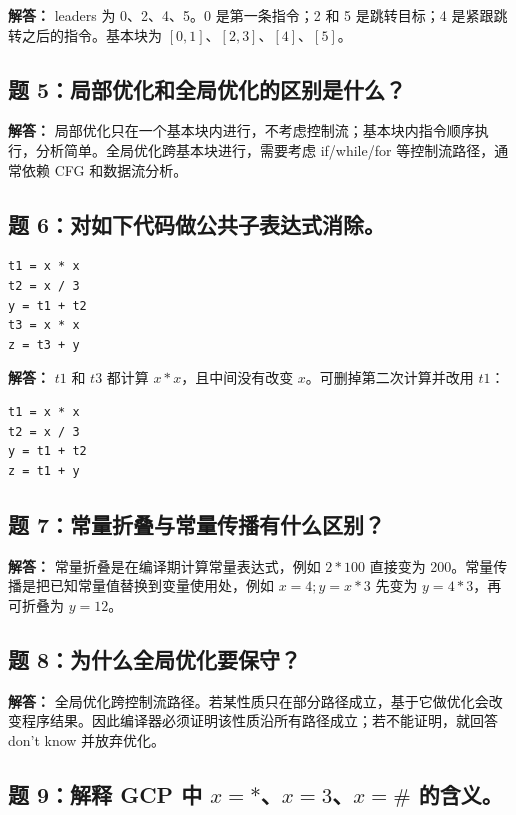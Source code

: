 \documentclass[UTF8,fontset=none,11pt]{ctexart}
\begin{document}
\textbf{解答：} leaders 为 0、2、4、5。0 是第一条指令；2 和 5 是跳转目标；4 是紧跟跳转之后的指令。基本块为 \([0,1]\)、\([2,3]\)、\([4]\)、\([5]\)。

\subsection*{题 5：局部优化和全局优化的区别是什么？}

\textbf{解答：} 局部优化只在一个基本块内进行，不考虑控制流；基本块内指令顺序执行，分析简单。全局优化跨基本块进行，需要考虑 if/while/for 等控制流路径，通常依赖 CFG 和数据流分析。

\subsection*{题 6：对如下代码做公共子表达式消除。}

\begin{verbatim}
t1 = x * x
t2 = x / 3
y = t1 + t2
t3 = x * x
z = t3 + y
\end{verbatim}

\textbf{解答：} \(t1\) 和 \(t3\) 都计算 \(x*x\)，且中间没有改变 \(x\)。可删掉第二次计算并改用 \(t1\)：

\begin{verbatim}
t1 = x * x
t2 = x / 3
y = t1 + t2
z = t1 + y
\end{verbatim}

\subsection*{题 7：常量折叠与常量传播有什么区别？}

\textbf{解答：} 常量折叠是在编译期计算常量表达式，例如 \(2*100\) 直接变为 200。常量传播是把已知常量值替换到变量使用处，例如 \(x=4; y=x*3\) 先变为 \(y=4*3\)，再可折叠为 \(y=12\)。

\subsection*{题 8：为什么全局优化要保守？}

\textbf{解答：} 全局优化跨控制流路径。若某性质只在部分路径成立，基于它做优化会改变程序结果。因此编译器必须证明该性质沿所有路径成立；若不能证明，就回答 don't know 并放弃优化。

\subsection*{题 9：解释 GCP 中 \texorpdfstring{\(x=*\)、\(x=3\)、\(x=\#\)}{x states} 的含义。}
\end{document}
